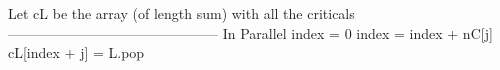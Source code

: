 \documentclass{report}
\begin{document}
{\begin{minipage}[b]{0.48\textwidth}
\begin{algorithm}[H]
\begin{algorithmic}
        \State Let cL be the array (of length sum) with all the criticals 
        \State --------------------------------------------- \Comment In Parallel 
        \State index = 0
          \State index = index + nC[j]
        \EndFor
        \State 
          \State cL[index + j] = L.pop 
        \EndFor
      \end{algorithmic}
  \end{algorithm}
  \end{minipage}}
\end{document}

